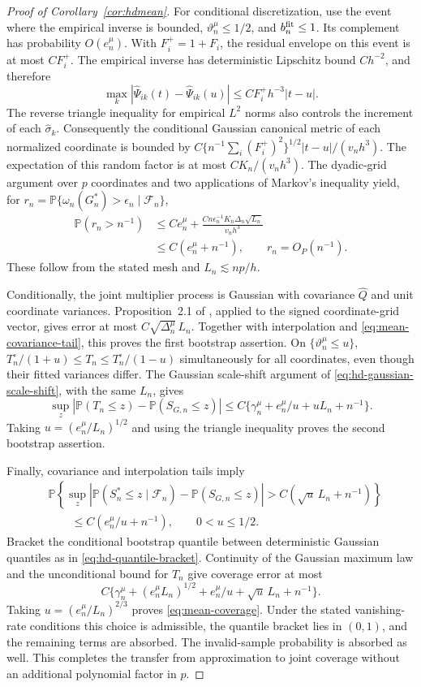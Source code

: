 \documentclass[10pt]{book}
\newcommand{\prob}{\mathbb{P}}
\numberwithin{equation}{section}
\begin{document}
\begin{proof}[Proof of Corollary~\ref{cor:hdmean}]
For conditional discretization, use the event where the empirical
inverse is bounded, $\vartheta_n^\mu\le1/2$, and $b_n^{\rm fit}\le1$.
Its complement has probability $O(e_n^\mu)$. With
$F_i^+=1+F_i$, the residual envelope on this event is at most $CF_i^+$.
The empirical inverse has deterministic
Lipschitz bound $Ch^{-2}$, and therefore
\[
\max_k|\widehat\Psi_{ik}(t)-\widehat\Psi_{ik}(u)|
\le CF_i^+ h^{-3}|t-u|.
\]
The reverse triangle inequality for empirical $L^2$ norms also
controls the increment of each $\widehat\sigma_k$.
Consequently the conditional Gaussian canonical metric of each
normalized coordinate is bounded by
$C\{n^{-1}\sum_i(F_i^+)^2\}^{1/2}|t-u|/(v_nh^3)$.
The expectation of this random factor is at most $CK_n/(v_nh^3)$.
The dyadic-grid argument over $p$ coordinates and two applications
of Markov's inequality yield, for
$r_n=\prob\{\omega_n(G_n^*)>\epsilon_n\mid\mathcal F_n\}$,
\[
\begin{aligned}
\prob(r_n>n^{-1})&\le Ce_n^\mu+
\frac{Cn\epsilon_n^{-1}K_n\Delta_n\sqrt{L_n}}{v_nh^3}
\\
&\le C(e_n^\mu+n^{-1}),\qquad r_n=O_P(n^{-1}).
\end{aligned}
\]
These follow from the stated mesh and $L_n\lesssim np/h$.

Conditionally, the joint multiplier process is Gaussian with covariance
$\widehat Q$ and unit coordinate variances. Proposition~2.1 of
\citet{chernozhukov_et_al_2022}, applied to the signed coordinate-grid
vector, gives error at most
$C\sqrt{\Delta_n^\mu}\,L_n$. Together with interpolation and
\eqref{eq:mean-covariance-tail}, this proves the first bootstrap assertion.
On $\{\vartheta_n^\mu\le u\}$,
$T_n^\circ/(1+u)\le T_n\le T_n^\circ/(1-u)$ simultaneously for all
coordinates, even though their fitted variances differ.
The Gaussian scale-shift argument of
\eqref{eq:hd-gaussian-scale-shift}, with the same $L_n$, gives
\[
\sup_z|\prob(T_n\le z)-\prob(S_{G,n}\le z)|
\le C\{\gamma_n^\mu+e_n^\mu/u+uL_n+n^{-1}\}.
\]
Taking $u=(e_n^\mu/L_n)^{1/2}$ and using the triangle inequality
proves the second bootstrap assertion.

Finally, covariance and interpolation tails imply
\[
\begin{aligned}
&\prob\left\{\sup_z|\prob(S_n^*\le z\mid\mathcal F_n)
-\prob(S_{G,n}\le z)|>C(\sqrt u\,L_n+n^{-1})\right\}\\
&\qquad\le C(e_n^\mu/u+n^{-1}),\qquad 0<u\le1/2 .
\end{aligned}
\]
Bracket the conditional bootstrap quantile between deterministic
Gaussian quantiles as in \eqref{eq:hd-quantile-bracket}. Continuity of
the Gaussian maximum law and the unconditional bound for $T_n$ give
coverage error at most
\[
C\{\gamma_n^\mu+(e_n^\mu L_n)^{1/2}
+e_n^\mu/u+\sqrt u\,L_n+n^{-1}\}.
\]
Taking $u=(e_n^\mu/L_n)^{2/3}$ proves \eqref{eq:mean-coverage}.
Under the stated vanishing-rate conditions this choice is admissible,
the quantile bracket lies in $(0,1)$, and the remaining terms are
absorbed. The invalid-sample probability is absorbed as well.
This completes the transfer from approximation to joint coverage
without an additional polynomial factor in $p$.
\end{proof}
\end{document}
